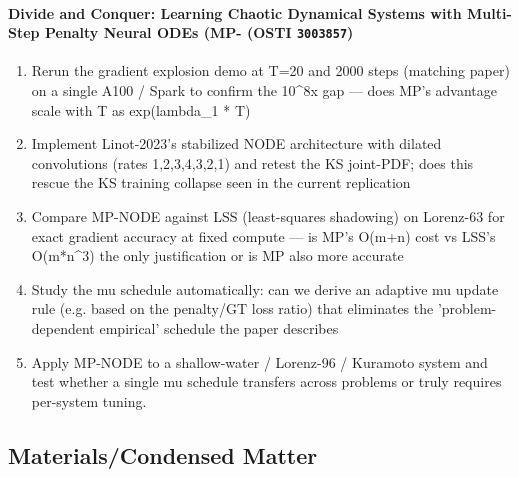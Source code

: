 \paragraph{Divide and Conquer: Learning Chaotic Dynamical Systems with Multi-Step Penalty Neural ODEs (MP- \textnormal{\small(OSTI \texttt{3003857})}}
\begin{enumerate}[leftmargin=1.6em,itemsep=0.2em,topsep=0.2em,label=Q\arabic*.]
\item Rerun the gradient explosion demo at T=20 and 2000 steps (matching paper) on a single A100 / Spark to confirm the 10\textasciicircum{}8x gap --- does MP's advantage scale with T as exp(lambda\_1 * T)
\item Implement Linot-2023's stabilized NODE architecture with dilated convolutions (rates 1,2,3,4,3,2,1) and retest the KS joint-PDF; does this rescue the KS training collapse seen in the current replication
\item Compare MP-NODE against LSS (least-squares shadowing) on Lorenz-63 for exact gradient accuracy at fixed compute --- is MP's O(m+n) cost vs LSS's O(m*n\textasciicircum{}3) the only justification or is MP also more accurate
\item Study the mu schedule automatically: can we derive an adaptive mu update rule (e.g. based on the penalty/GT loss ratio) that eliminates the 'problem-dependent empirical' schedule the paper describes
\item Apply MP-NODE to a shallow-water / Lorenz-96 / Kuramoto system and test whether a single mu schedule transfers across problems or truly requires per-system tuning.
\end{enumerate}
\subsection*{Materials/Condensed Matter}

